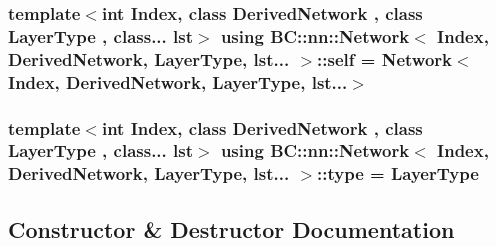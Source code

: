 \subsubsection[{\texorpdfstring{self}{self}}]{\setlength{\rightskip}{0pt plus 5cm}template$<$int Index, class Derived\+Network , class Layer\+Type , class... lst$>$ using {\bf B\+C\+::nn\+::\+Network}$<$ Index, Derived\+Network, Layer\+Type, lst... $>$\+::{\bf self} =  {\bf Network}$<$Index, Derived\+Network, Layer\+Type, lst...$>$}\hypertarget{structBC_1_1nn_1_1Network_3_01Index_00_01DerivedNetwork_00_01LayerType_00_01lst_8_8_8_01_4_a09152ae5941e765b64e7203c4b86be13}{}\label{structBC_1_1nn_1_1Network_3_01Index_00_01DerivedNetwork_00_01LayerType_00_01lst_8_8_8_01_4_a09152ae5941e765b64e7203c4b86be13}
\subsubsection[{\texorpdfstring{type}{type}}]{\setlength{\rightskip}{0pt plus 5cm}template$<$int Index, class Derived\+Network , class Layer\+Type , class... lst$>$ using {\bf B\+C\+::nn\+::\+Network}$<$ Index, Derived\+Network, Layer\+Type, lst... $>$\+::{\bf type} =  Layer\+Type}\hypertarget{structBC_1_1nn_1_1Network_3_01Index_00_01DerivedNetwork_00_01LayerType_00_01lst_8_8_8_01_4_a2c37c2373f485614d0c04bb880cbc0e1}{}\label{structBC_1_1nn_1_1Network_3_01Index_00_01DerivedNetwork_00_01LayerType_00_01lst_8_8_8_01_4_a2c37c2373f485614d0c04bb880cbc0e1}


\subsection{Constructor \& Destructor Documentation}
